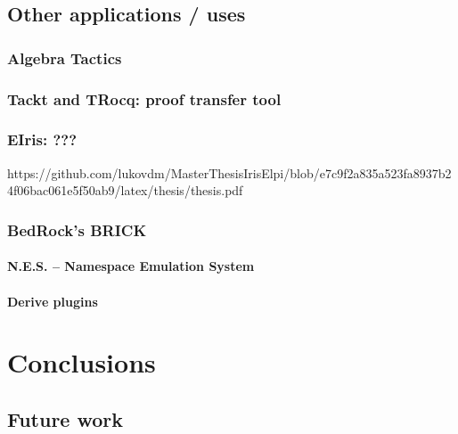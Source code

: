 \documentclass[a4paper, 11pt]{book}
\begin{document}
\section{Other applications / uses}
\subsection{Algebra Tactics}

\cite{sakaguchi:LIPIcs.ITP.2022.29}

\subsection{Tackt and TRocq: proof transfer tool}

\cite{DBLP:conf/cpp/Blot0CPKMV23}
\cite{10.1007/978-3-031-57262-3_10}

\subsection{EIris: ???}

https://github.com/lukovdm/MasterThesisIrisElpi/blob/e7c9f2a835a523fa8937b24f06bac061e5f50ab9/latex/thesis/thesis.pdf

\subsection{BedRock's BRICK}
\subsubsection{N.E.S. -- Namespace Emulation System}
\subsubsection{Derive plugins}


\chapter{Conclusions}
\section{Future work}
\nocite{*}
\printbibliography[title={Our Bibliography}, keyword=me]
\printbibliography[title={Bibliography}, keyword=they]
\end{document}

